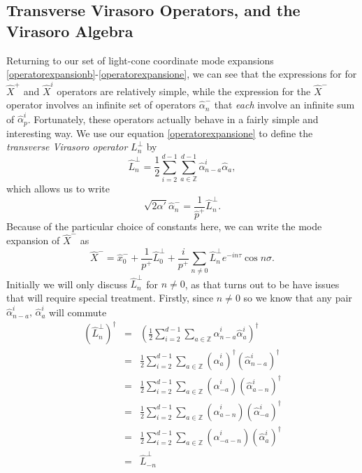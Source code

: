 \documentclass[a4paper,12pt]{article}
\numberwithin{equation}{section}
\begin{document}
\subsection{Transverse Virasoro Operators, and the Virasoro Algebra}\label{secvirasoro}
Returning to our set of light-cone coordinate mode expansions \ref{operatorexpansionb}-\ref{operatorexpansione}, we can see that the expressions for for $\hat{X}^+$ and $\hat{X}^i$ operators are relatively simple, while the expression for the $\hat{X}^-$ operator involves an infinite set of operators $\hat{\alpha}_n^-$ that \emph{each} involve an infinite sum of $\hat{\alpha}_p^i$. Fortunately, these operators actually behave in a fairly simple and interesting way. We use our equation \ref{operatorexpansione} to define the \emph{transverse Virasoro operator} $L_n^\perp$ by
\begin{equation}\label{virasorosum}
\hat{L}_n^\perp = \frac{1}{2}\sum_{i=2}^{d-1}\sum_{a\in\mathbb{Z}}^{d-1}\hat{\alpha}_{n-a}^i\hat{\alpha}_a,
\end{equation}
which allows us to write
\begin{equation}
\sqrt{2\alpha'}\hat{\alpha}_n^- = \frac{1}{\hat{p}^+}\hat{L}_n^\perp.
\end{equation}
Because of the particular choice of constants here, we can write the mode expansion of $\hat{X}^-$ as
\begin{equation}
\hat{X}^- = \hat{x}_0^-+\frac{1}{p^+}\hat{L}_0^\perp + \frac{i}{p^+}\sum_{n \ne 0}\hat{L}_n^\perp e^{-in\tau}\cos n\sigma.
\end{equation}
Initially we will only discuss $\hat{L}_n^\perp$ for $n \ne 0$, as that turns out to be have issues that will require special treatment. Firstly, since $n \ne 0$ so we know that any pair $\hat{\alpha}_{n-a}^i,\,\hat{\alpha}_a^i$ will commute
\begin{eqnarray*}
(\hat{L}_n^\perp)^\dagger &=& \left(\frac{1}{2}\sum_{i=2}^{d-1}\sum_{a \in \mathbb{Z}}\hat{\alpha}_{n-a}^i\hat{\alpha}_{a}^i\right)^\dagger\\
&=&\frac{1}{2}\sum_{i=2}^{d-1}\sum_{a \in \mathbb{Z}}(\hat{\alpha}_a^i)^\dagger(\hat{\alpha}_{n-a}^i)^\dagger\\
&=&\frac{1}{2}\sum_{i=2}^{d-1}\sum_{a \in \mathbb{Z}}(\hat{\alpha}_{-a}^i)(\hat{\alpha}_{a-n}^i)^\dagger\\
&=&\frac{1}{2}\sum_{i=2}^{d-1}\sum_{a \in \mathbb{Z}}(\hat{\alpha}_{a-n}^i)(\hat{\alpha}_{-a}^i)^\dagger\\
&=&\frac{1}{2}\sum_{i=2}^{d-1}\sum_{a \in \mathbb{Z}}(\hat{\alpha}_{-a-n}^i)(\hat{\alpha}_{a}^i)^\dagger\\
&=&\hat{L}_{-n}^\perp
\end{eqnarray*}
\end{document}
